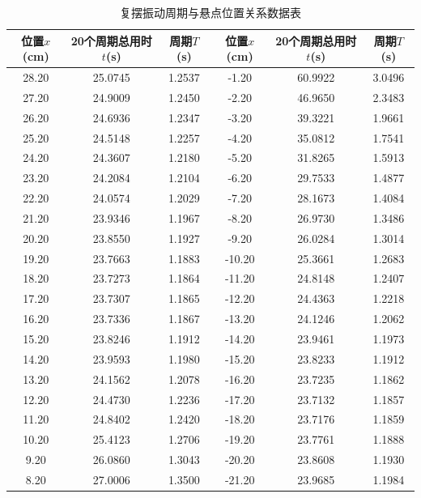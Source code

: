 \documentclass[a4paper]{ctexart}
\begin{document}
    \begin{table}[htbp]
        \centering
        \caption{复摆振动周期与悬点位置关系数据表}
        \begin{tabular}{cccccc}
            \toprule[1.5pt]
            位置$x$(cm) & 20个周期总用时$t$(s) & 周期$T$(s) & 位置$x$(cm) & 20个周期总用时$t$(s) & 周期$T$(s) \\
            \midrule    
            28.20 & 25.0745 & 1.2537 & -1.20 & 60.9922 & 3.0496 \\
            27.20 & 24.9009 & 1.2450 & -2.20 & 46.9650 & 2.3483 \\
            26.20 & 24.6936 & 1.2347 & -3.20 & 39.3221 & 1.9661 \\
            25.20 & 24.5148 & 1.2257 & -4.20 & 35.0812 & 1.7541 \\
            24.20 & 24.3607 & 1.2180 & -5.20 & 31.8265 & 1.5913 \\
            23.20 & 24.2084 & 1.2104 & -6.20 & 29.7533 & 1.4877 \\
            22.20 & 24.0574 & 1.2029 & -7.20 & 28.1673 & 1.4084 \\
            21.20 & 23.9346 & 1.1967 & -8.20 & 26.9730 & 1.3486 \\
            20.20 & 23.8550 & 1.1927 & -9.20 & 26.0284 & 1.3014 \\
            19.20 & 23.7663 & 1.1883 & -10.20 & 25.3661 & 1.2683 \\
            18.20 & 23.7273 & 1.1864 & -11.20 & 24.8148 & 1.2407 \\
            17.20 & 23.7307 & 1.1865 & -12.20 & 24.4363 & 1.2218 \\
            16.20 & 23.7336 & 1.1867 & -13.20 & 24.1246 & 1.2062 \\
            15.20 & 23.8246 & 1.1912 & -14.20 & 23.9461 & 1.1973 \\
            14.20 & 23.9593 & 1.1980 & -15.20 & 23.8233 & 1.1912 \\
            13.20 & 24.1562 & 1.2078 & -16.20 & 23.7235 & 1.1862 \\
            12.20 & 24.4730 & 1.2236 & -17.20 & 23.7132 & 1.1857 \\
            11.20 & 24.8402 & 1.2420 & -18.20 & 23.7176 & 1.1859 \\
            10.20 & 25.4123 & 1.2706 & -19.20 & 23.7761 & 1.1888 \\
            9.20 & 26.0860 & 1.3043 & -20.20 & 23.8608 & 1.1930 \\
            8.20 & 27.0006 & 1.3500 & -21.20 & 23.9685 & 1.1984 \\

\end{tabular}
\end{table}
\end{document}
